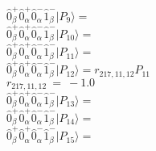 \documentclass[14pt]{article}
\begin{document}
    $ \hat{0}_{\beta}^{+}\hat{0}_{\alpha}^{+}\hat{0}_{\alpha}^{-}\hat{1}_{\beta}^{-} \vert{P_{9}}\rangle =  $ \\ 
    $ \hat{0}_{\beta}^{+}\hat{0}_{\alpha}^{+}\hat{0}_{\alpha}^{-}\hat{1}_{\beta}^{-} \vert{P_{10}}\rangle =  $ \\ 
    $ \hat{0}_{\beta}^{+}\hat{0}_{\alpha}^{+}\hat{0}_{\alpha}^{-}\hat{1}_{\beta}^{-} \vert{P_{11}}\rangle =  $ \\ 
    $ \hat{0}_{\beta}^{+}\hat{0}_{\alpha}^{+}\hat{0}_{\alpha}^{-}\hat{1}_{\beta}^{-} \vert{P_{12}}\rangle = {r}_{217,11,12}P_{11} $ \\ 
    ${r}_{217,11,12}\ =\ -1.0 $ \\ 
    $ \hat{0}_{\beta}^{+}\hat{0}_{\alpha}^{+}\hat{0}_{\alpha}^{-}\hat{1}_{\beta}^{-} \vert{P_{13}}\rangle =  $ \\ 
    $ \hat{0}_{\beta}^{+}\hat{0}_{\alpha}^{+}\hat{0}_{\alpha}^{-}\hat{1}_{\beta}^{-} \vert{P_{14}}\rangle =  $ \\ 
    $ \hat{0}_{\beta}^{+}\hat{0}_{\alpha}^{+}\hat{0}_{\alpha}^{-}\hat{1}_{\beta}^{-} \vert{P_{15}}\rangle =  $ \\ 
    
\end{document}
